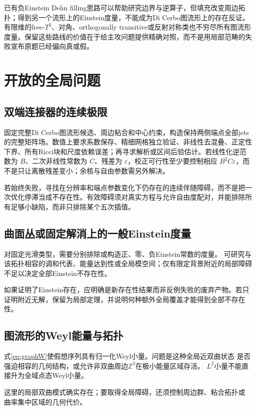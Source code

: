 \documentclass[UTF8,a4paper,11pt,fontset=fandol]{ctexart}
\numberwithin{equation}{section}
\theoremstyle{definition}
\newcommand{\Z}{\mathbb Z}
\begin{document}
已有负Einstein Dehn filling思路可以帮助研究边界与逆算子，但填充改变周边拓扑；得到另一个流形上的Einstein度量，不能成为Di Cerbo图流形上的存在反证。有限维的free-$T^2$、对角、orthogonally transitive或反射对称类也不穷尽所有图流形度量。保留这些路线的价值在于给主攻问题提供精确对照，而不是用局部范畴的失败宣布原题已经偏向真或假。

\section{开放的全局问题}
\subsection{双端连接器的连续极限}
固定完整Di Cerbo图流形候选、周边粘合和中心约束，构造保持两侧端点全部jets的完整矩阵场。数值上要求系数保存、精细网格独立验证、非线性去混叠、正定性下界、所有Ricci块和尺度依赖误差；再寻求解析或区间后验估计。若线性化逆范数为 $B$、二次非线性常数为 $C$、残差为 $\varepsilon$，校正可行性至少要控制相应 $B^2C\varepsilon$，而不是只让离散残差变小；余核与自由参数需另外解决。

若始终失败，寻找在分辨率和端点参数变化下仍存在的连续伴随障碍，而不是把一次优化停滞当成不存在性。有效障碍须对真实方程与允许自由度配对，并能排除所有足够小缺陷，而非只排除某个五次插值。

\subsection{曲面丛或固定解消上的一般Einstein度量}
对固定光滑类型，需要分别排除或构造正、零、负Einstein常数的度量。
可研究与该拓扑相容的调和代表、能量达到性或全局模空间；仅有限定背景附近的局部障碍
不足以决定全部Einstein不存在性。

如果证明了Einstein存在，应明确是新存在性结果而非反例失败的废弃产物。若只证明附近无解，保留为局部定理，并说明何种额外全局覆盖才能得到全部不存在性。

\subsection{图流形的Weyl能量与拓扑}
式\eqref{eq:graphW}使假想序列具有归一化Weyl小量。问题是这种全局近双曲状态
是否强迫相容的几何结构，或允许非双曲周边$\Z^3$在极小能量区域存活。
$L^2$小量不能直接升为全域点态Weyl小量。

这里的局部双曲模式确实存在；要取得全局障碍，还须控制周边群、粘合拓扑或
曲率集中区域的几何代价。
\end{document}
